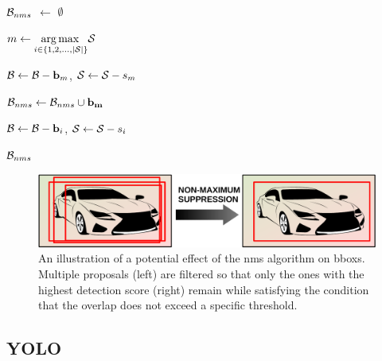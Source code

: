 \begin{algorithmic}[1]

    \State $\mathcal{B}_{nms}$ $\gets$ $\emptyset$


    \State $m \gets \underset{i \in \left\{ {1, 2, \dots, \left\vert \mathcal{S} \right\vert} \right\}}{\operatorname*{arg\,max}{}} \mathcal{S}$

    \State $\mathcal{B} \gets \mathcal{B} - \mathbf{b}_m$, $\mathcal{S} \gets \mathcal{S} - s_m$

    \State $\mathcal{B}_{nms} \gets \mathcal{B}_{nms} \cup \mathbf{b_m}$



    \State $\mathcal{B} \gets \mathcal{B} - \mathbf{b}_i$, $\mathcal{S} \gets \mathcal{S} - s_i$
    \EndIf
    \EndFor
    \EndWhile

    \State \Return $\mathcal{B}_{nms}$
    \EndFunction
\end{algorithmic}

\begin{figure}[t]
    \centerline{\includegraphics[width=0.6\linewidth]{figures/theoretical_foundations/non_maximum_suppression.pdf}}
    \caption[\Gls{nms} visualization]{An illustration of a potential effect of the \gls{nms} algorithm on \glspl{bbox}. Multiple proposals (left) are filtered so that only the ones with the highest detection score (right) remain while satisfying the condition that the overlap does not exceed a specific threshold.}
    \label{fig:NonMaximumSuppression}
\end{figure}

\subsection{YOLO}
\label{ssec:YouLookOnlyOnce}

